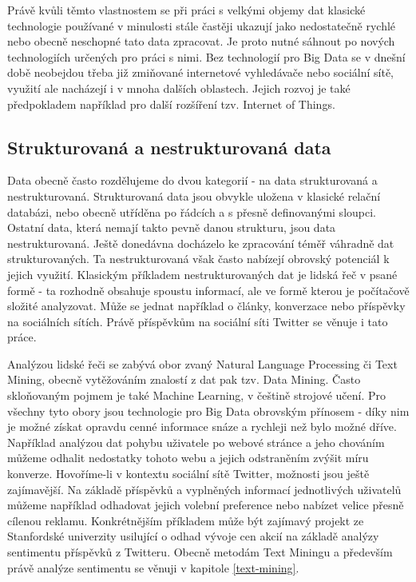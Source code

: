 \documentclass[thesis=B,czech]{FITthesis}[2012/06/26]
\begin{document}
	Právě kvůli těmto vlastnostem se při práci s velkými objemy dat klasické technologie používané v minulosti stále častěji ukazují jako nedostatečně rychlé nebo obecně neschopné tato data zpracovat. Je proto nutné sáhnout po nových technologiích určených pro práci s nimi. Bez technologií pro Big Data se v dnešní době neobejdou třeba již zmiňované internetové vyhledávače nebo sociální sítě, využití ale nacházejí i v mnoha dalších oblastech. Jejich rozvoj je také předpokladem například pro další rozšíření tzv. Internet of Things\cite{bigdata-iot}.  

\subsection{Strukturovaná a nestrukturovaná data}	
	Data obecně často rozdělujeme do dvou kategorií - na data strukturovaná a nestrukturovaná. Strukturovaná data jsou obvykle uložena v klasické relační databázi, nebo obecně utříděna po řádcích a s přesně definovanými sloupci. Ostatní data, která nemají takto pevně danou strukturu, jsou data nestrukturovaná. Ještě donedávna docházelo ke zpracování téměř váhradně dat strukturovaných. Ta nestrukturovaná však často nabízejí obrovský potenciál k jejich využití. Klasickým příkladem nestrukturovaných dat je lidská řeč v psané formě - ta rozhodně obsahuje spoustu informací, ale ve formě kterou je počítačově složité analyzovat. Může se jednat například o články, konverzace nebo příspěvky na sociálních sítích.  Právě příspěvkům na sociální síti Twitter se věnuje i tato práce. 
	
	Analýzou lidské řeči se zabývá obor zvaný Natural Language Processing či Text Mining, obecně vytěžováním znalostí z dat pak tzv. Data Mining. Často skloňovaným pojmem je také Machine Learning, v češtině strojové učení. Pro všechny tyto obory jsou technologie pro Big Data obrovským přínosem - díky nim je možné získat opravdu cenné informace snáze a rychleji než bylo možné dříve. Například analýzou dat pohybu uživatele po webové stránce a jeho chováním můžeme odhalit nedostatky tohoto webu a jejich odstraněním zvýšit míru konverze. Hovoříme-li v kontextu sociální sítě Twitter, možnosti jsou ještě zajímavější. Na základě příspěvků a vyplněných informací jednotlivých uživatelů můžeme například odhadovat jejich volební preference nebo nabízet velice přesně cílenou reklamu. Konkrétnějším příkladem může být zajímavý projekt ze Stanfordské univerzity usilující o odhad vývoje cen akcií na základě analýzy sentimentu příspěvků z Twitteru\cite{stock-stanford}. Obecně metodám Text Miningu a především právě analýze sentimentu se věnuji v kapitole \ref{text-mining}.  
\end{document}
